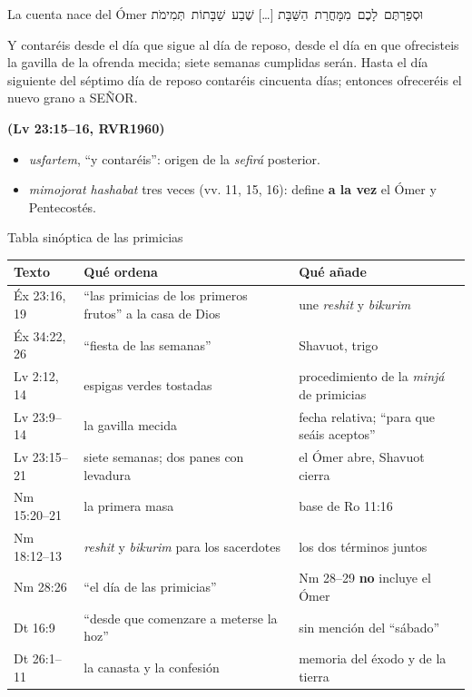 \documentclass[hyperref={bookmarks=false},aspectratio=169]{beamer}
\newcommand{\heb}[1]{\mbox{\foreignlanguage{hebrew}{#1}}}
\newcommand{\SENOR}{S{\fontsize{0.78em}{1em}\selectfont EÑOR}}
\newcommand{\fuente}[1]{\par\hfill{\upshape\bfseries\footnotesize\textcolor{tierraroja}{#1}}}
\newcommand{\destacar}[1]{\textbf{\textcolor{tierraroja}{#1}}}
\begin{document}
\begin{frame}{La cuenta nace del Ómer}
\centering\heb{וּסְפַרְתֶּם לָכֶם מִמָּחֳרַת הַשַּׁבָּת} \foreignlanguage{spanish}{[\ldots]} \heb{שֶׁבַע שַׁבָּתוֹת תְּמִימֹת}
\begin{cita}Y contaréis desde el día que sigue al día de reposo, desde el día en que ofrecisteis la gavilla de la ofrenda mecida; siete semanas cumplidas serán. Hasta el día siguiente del séptimo día de reposo contaréis cincuenta días; entonces ofreceréis el nuevo grano a \SENOR.\fuente{(Lv 23:15--16, RVR1960)}\end{cita}
\small\RaggedRight
\begin{itemize}
\item \emph{usfartem}, ``y contaréis'': origen de la \emph{sefirá} posterior.
\item \emph{mimojorat hashabat} tres veces (vv. 11, 15, 16): define \destacar{a la vez} el Ómer y Pentecostés.
\end{itemize}
\end{frame}

\begin{frame}{Tabla sinóptica de las primicias}
\scriptsize\renewcommand{\arraystretch}{1.08}
\begin{tabular}{@{}L{2.0cm}L{4.6cm}L{5.3cm}@{}}
\toprule
\textbf{Texto} & \textbf{Qué ordena} & \textbf{Qué añade} \\ \midrule
Éx 23:16, 19 & ``las primicias de los primeros frutos'' a la casa de Dios & une \emph{reshit} y \emph{bikurim} \\
Éx 34:22, 26 & ``fiesta de las semanas'' & Shavuot, trigo \\
Lv 2:12, 14 & espigas verdes tostadas & procedimiento de la \emph{minjá} de primicias \\
Lv 23:9--14 & la gavilla mecida & fecha relativa; ``para que seáis aceptos'' \\
Lv 23:15--21 & siete semanas; dos panes con levadura & el Ómer abre, Shavuot cierra \\
Nm 15:20--21 & la primera masa & base de Ro 11:16 \\
Nm 18:12--13 & \emph{reshit} y \emph{bikurim} para los sacerdotes & los dos términos juntos \\
Nm 28:26 & ``el día de las primicias'' & Nm 28--29 \destacar{no} incluye el Ómer \\
Dt 16:9 & ``desde que comenzare a meterse la hoz'' & sin mención del ``sábado'' \\
Dt 26:1--11 & la canasta y la confesión & memoria del éxodo y de la tierra \\
\bottomrule
\end{tabular}
\end{frame}
\end{document}
